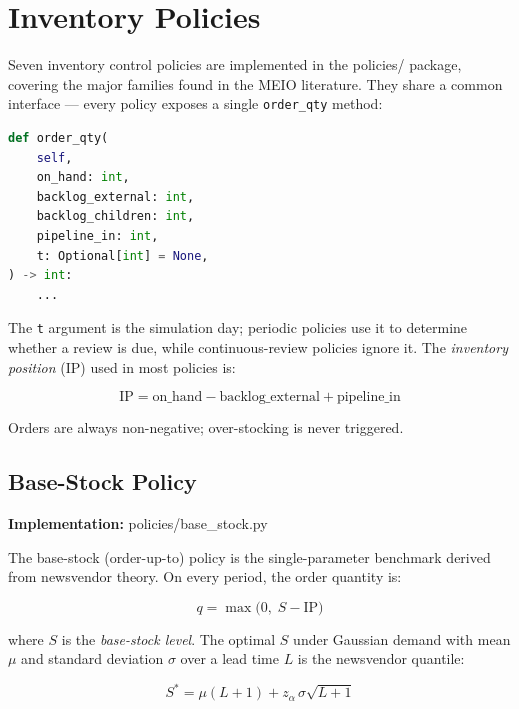 \chapter{Inventory Policies}
\label{chap:policies}

Seven inventory control policies are implemented in the policies/
package, covering the major families found in the MEIO literature.
They share a common interface --- every policy exposes a single
\texttt{order\_qty} method:

\begin{lstlisting}[language=Python, caption={Universal policy interface.}]
def order_qty(
    self,
    on_hand: int,
    backlog_external: int,
    backlog_children: int,
    pipeline_in: int,
    t: Optional[int] = None,
) -> int:
    ...
\end{lstlisting}

The \texttt{t} argument is the simulation day; periodic policies use it
to determine whether a review is due, while continuous-review policies
ignore it.  The \emph{inventory position} (IP) used in most policies is:

\begin{equation}
  \text{IP} = \text{on\_hand} - \text{backlog\_external}
             + \text{pipeline\_in}
  \label{eq:ip}
\end{equation}

Orders are always non-negative; over-stocking is never triggered.

\section{Base-Stock Policy}
\label{sec:policies:bs}

\textbf{Implementation:} policies/base\_stock.py

The base-stock (order-up-to) policy is the single-parameter benchmark
derived from newsvendor theory.  On every period, the order quantity is:

\begin{equation}
  q = \max\!\bigl(0,\; S - \text{IP}\bigr)
  \label{eq:basestock}
\end{equation}

where $S$ is the \emph{base-stock level}.  The optimal $S$ under Gaussian
demand with mean $\mu$ and standard deviation $\sigma$ over a lead time $L$
is the newsvendor quantile:

\begin{equation}
  S^* = \mu(L+1) + z_\alpha \,\sigma\sqrt{L+1}
  \label{eq:newsvendor}
\end{equation}

